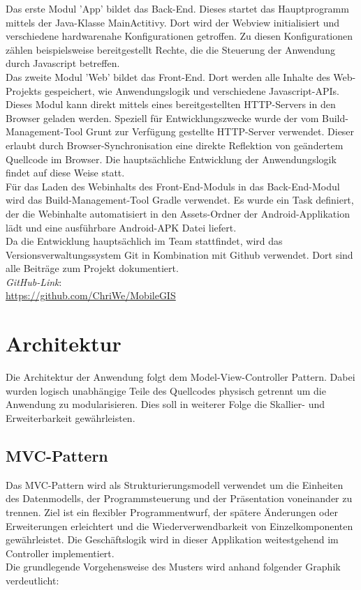 Das erste Modul 'App' bildet das Back-End. Dieses startet das Hauptprogramm mittels der Java-Klasse MainActitivy. Dort wird der Webview initialisiert und verschiedene hardwarenahe Konfigurationen getroffen. Zu diesen Konfigurationen zählen beispielsweise bereitgestellt Rechte, die die Steuerung der Anwendung durch Javascript betreffen. \\
Das zweite Modul 'Web' bildet das Front-End. Dort werden alle Inhalte des Web-Projekts gespeichert, wie Anwendungslogik und verschiedene Javascript-APIs. Dieses Modul kann direkt mittels eines bereitgestellten HTTP-Servers in den Browser geladen werden. Speziell für Entwicklungszwecke wurde der vom Build-Management-Tool Grunt zur Verfügung gestellte HTTP-Server verwendet. Dieser erlaubt durch Browser-Synchronisation eine direkte Reflektion von geändertem Quellcode im Browser. Die hauptsächliche Entwicklung der Anwendungslogik findet auf diese Weise statt. \\
Für das Laden des Webinhalts des Front-End-Moduls in das Back-End-Modul wird das Build-Management-Tool Gradle verwendet. Es wurde ein Task definiert, der die Webinhalte automatisiert in den Assets-Ordner der Android-Applikation lädt und eine ausführbare Android-APK Datei liefert. \\
Da die Entwicklung hauptsächlich im Team stattfindet, wird das Versionsverwaltungssystem Git in Kombination mit Github verwendet. Dort sind alle Beiträge zum Projekt dokumentiert. \\

\textit{GitHub-Link}: \\
\href{https://github.com/ChriWe/MobileGIS}{https://github.com/ChriWe/MobileGIS}


\section{Architektur}
\label{sec:architektur}

Die Architektur der Anwendung folgt dem Model-View-Controller Pattern. Dabei wurden logisch unabhängige Teile des Quellcodes physisch getrennt um die Anwendung zu modularisieren. Dies soll in weiterer Folge die Skallier- und Erweiterbarkeit gewährleisten. 

\subsection{MVC-Pattern}
\label{subsec:mvc}

Das MVC-Pattern wird als Strukturierungsmodell verwendet um die Einheiten des Datenmodells, der Programmsteuerung und der Präsentation voneinander zu trennen. Ziel ist ein flexibler Programmentwurf, der spätere Änderungen oder Erweiterungen erleichtert und die Wiederverwendbarkeit von Einzelkomponenten gewährleistet. Die Geschäftslogik wird in dieser Applikation weitestgehend im Controller implementiert. \\
Die grundlegende Vorgehensweise des Musters wird anhand folgender Graphik verdeutlicht:

